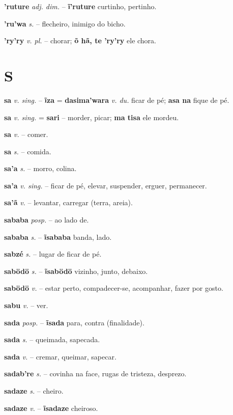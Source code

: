 \textbf{'ruture} \textit{adj. dim.} -- \textbf{ĩ'ruture} curtinho, pertinho.

\textbf{'ru'wa} \textit{s.} -- flecheiro, inimigo do bicho.

\textbf{'ry'ry} \textit{v. pl.} -- chorar; \textbf{õ hã, te 'ry'ry} ele chora.



\section*{S}

\textbf{sa} \textit{v. sing.} -- \textbf{ĩza} = \textbf{dasima'wara} \textit{v. du.} ficar de pé; \textbf{asa na} fique de pé.

\textbf{sa} \textit{v. sing.} = \textbf{sari} -- morder, picar; \textbf{ma tisa} ele mordeu.

\textbf{sa} \textit{v.} -- comer.

\textbf{sa} \textit{s.} -- comida.

\textbf{sa'a} \textit{s.} -- morro, colina.

\textbf{sa'a} \textit{v. sing.} -- ficar de pé, elevar, suspender, erguer, permanecer.

\textbf{sa'ã} \textit{v.} -- levantar, carregar (terra, areia).

\textbf{sababa} \textit{posp.} -- ao lado de.

\textbf{sababa} \textit{s.} -- \textbf{ĩsababa} banda, lado.

\textbf{sabzé} \textit{s.} -- lugar de ficar de pé.

\textbf{sabödö} \textit{s.} -- \textbf{ĩsabödö} vizinho, junto, debaixo.

\textbf{sabödö} \textit{v.} -- estar perto, compadecer-se, acompanhar, fazer por gosto.

\textbf{sabu} \textit{v.} -- ver.

\textbf{sada} \textit{posp.} -- \textbf{ĩsada} para, contra (finalidade).

\textbf{sada} \textit{s.} -- queimada, sapecada.

\textbf{sada} \textit{v.} -- cremar, queimar, sapecar.

\textbf{sadab're} \textit{s.} -- covinha na face, rugas de tristeza, desprezo.

\textbf{sadaze} \textit{s.} -- cheiro.

\textbf{sadaze} \textit{v.} -- \textbf{ĩsadaze} cheiroso.

